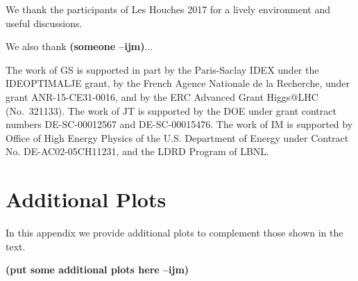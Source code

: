 \documentclass[11pt,letterpaper]{article}
\newcommand{\ijm}[1]{\textbf{\textcolor{llblue}{(#1 --ijm)}}}
\begin{document}
\begin{acknowledgments}

We thank the participants of Les Houches 2017 for a lively environment and useful discussions.

We also thank \ijm{someone}...

The work of GS is supported in part by the Paris-Saclay IDEX under the
IDEOPTIMALJE grant, by the French Agence Nationale de la Recherche,
under grant ANR-15-CE31-0016, and by the ERC Advanced Grant Higgs@LHC
(No.\ 321133).
%
The work of JT is supported by the DOE under grant contract numbers DE-SC-00012567 and DE-SC-00015476.
%
The work of IM is supported by Office of High Energy Physics of the U.S. Department of Energy under Contract No. DE-AC02-05CH11231, and the LDRD Program of LBNL.


\end{acknowledgments}



\appendix

\section{Additional Plots}\label{app:more_plot}

In this appendix we provide additional plots to complement those shown in the text.

\ijm{put some additional plots here}

%
%
%
%
%
%

%
%
%
%
%
%
%
%
%
\end{document}
